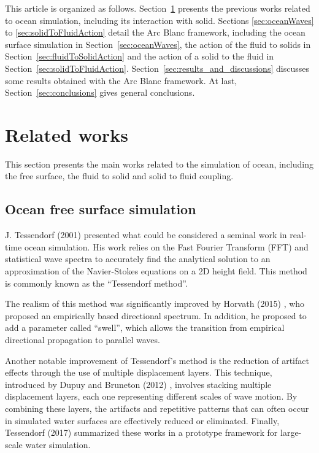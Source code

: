 \documentclass[11pt]{article}
\def\framework{the Arc Blanc framework\xspace}
\begin{document}
This article is organized as follows.
Section~\ref{sec:relatedwork} presents the previous works related to ocean simulation, including its interaction with solid.
Sections \ref{sec:oceanWaves} to \ref{sec:solidToFluidAction} detail \framework, including the ocean surface simulation in Section~\ref{sec:oceanWaves}, the action of the fluid to solids in Section~\ref{sec:fluidToSolidAction} and the action of a solid to the fluid in Section~\ref{sec:solidToFluidAction}.
Section~\ref{sec:results_and_discussions} discusses some results obtained with \framework.
At last, Section~\ref{sec:conclusions} gives general conclusions.

\section{Related works}
\label{sec:relatedwork}
This section presents the main works related to the simulation of ocean, including the free surface, the fluid to solid and solid to fluid coupling.

\subsection{Ocean free surface simulation}
\label{subsubsec:oceanFreeSurfaceSim}
J. Tessendorf (2001) \cite{tessendorfSimulatingOceanWater2001} presented what could be considered a seminal work in real-time ocean simulation. His work relies on the Fast Fourier Transform (FFT) and statistical wave spectra to accurately find the analytical solution to an approximation of the Navier-Stokes equations on a 2D height field. This method is commonly known as the “Tessendorf method”.

The realism of this method was significantly improved by Horvath (2015) \cite{horvathEmpiricalDirectionalWave2015}, who proposed an empirically based directional spectrum.
In addition, he proposed to add a parameter called “swell”, which allows the transition from empirical directional propagation to parallel waves.

Another notable improvement of Tessendorf's method is the reduction of artifact effects through the use of multiple displacement layers.
This technique, introduced by Dupuy and Bruneton (2012) \cite{dupuyRealtimeAnimationRendering2012}, involves stacking multiple displacement layers, each one representing different scales of wave motion.
By combining these layers, the artifacts and repetitive patterns that can often occur in simulated water surfaces are effectively reduced or eliminated.
Finally, Tessendorf (2017) \cite{tessendorfGilliganPrototypeFramework2017} summarized these works in a prototype framework for large-scale water simulation.
\end{document}
